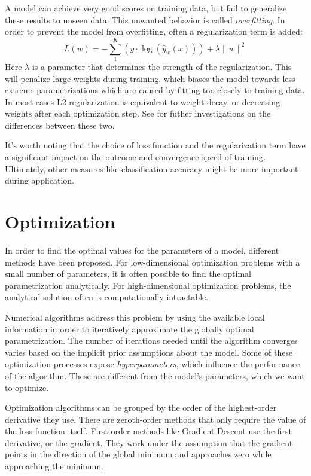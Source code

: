 \documentclass[twoside,12pt,a4paper]{report}
\begin{document}
A model can achieve very good scores on training data, but fail to generalize these results to unseen data. This unwanted behavior is called \textit{overfitting}.
In order to prevent the model from overfitting, often a regularization term is added:
$$L(w) = - \sum_{1}^{K}(y \cdot \log(\hat{y}_w(x) )) + \lambda \| w\|^2 $$
Here $\lambda$ is a parameter that determines the strength of the regularization. This will penalize large weights during training, which biases the model towards less extreme parametrizations which are caused by fitting too closely to training data. In most cases L2 regularization is equivalent to weight decay, or decreasing weights after each optimization step. See \cite{Chaudhari2017entropy} for futher investigations on the differences between these two.

It's worth noting that the choice of loss function and the regularization term have a significant impact on the outcome and convergence speed of training. Ultimately, other measures like classification accuracy might be more important during application.

\section{Optimization}
In order to find the optimal values for the parameters of a model, different methods have been proposed. For low-dimensional optimization problems with a small number of parameters, it is often possible to find the optimal parametrization analytically. For high-dimensional optimization problems, the analytical solution often is computationally intractable. 

Numerical algorithms address this problem by using the available local information in order to iteratively approximate the globally optimal parametrization. The number of iterations needed until the algorithm converges varies based on the implicit prior assumptions about the model.
Some of these optimization processes expose \textit{hyperparameters}, which influence the performance of the algorithm. These are different from the model's parameters, which we want to optimize.

Optimization algorithms can be grouped by the order of the highest-order derivative they use.
There are zeroth-order methods that only require the value of the loss function itself.
First-order methods like Gradient Descent use the first derivative, or the gradient. They work under the assumption that the gradient points in the direction of the global minimum and approaches zero while approaching the minimum.
\end{document}
